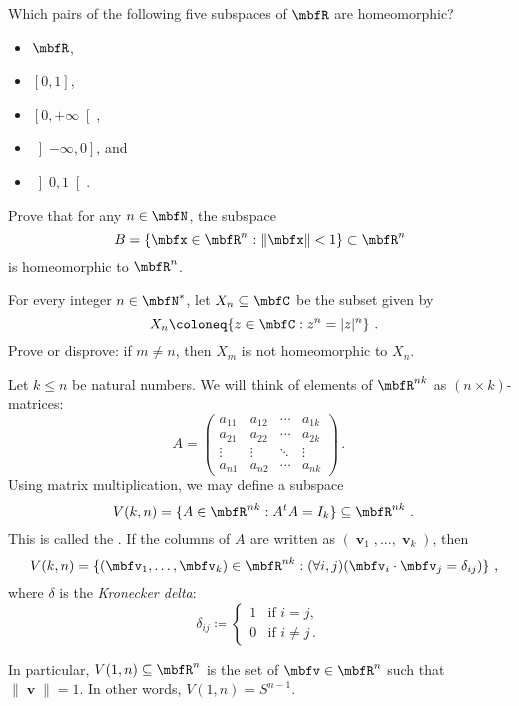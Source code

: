 \documentclass[a4paper,twoside,nols,nobib]{tufte-handout}
\begin{document}

\begin{Problem}
	\noindent
	Which pairs of the following five subspaces of $\RR$ are homeomorphic?
	\begin{itemize}
		\item $\RR$,
		\item $[0,1]$,
		\item $\left[0,+\infty\right[$,
		\item $\left]-\infty, 0\right]$, and
		\item $\left]0,1\right[$.
	\end{itemize}
\end{Problem}


\begin{Problem}
	\noindent
	Prove that for any $n \in \NN$, the subspace
	\[
		B = \{\mbfx \in \RR^n : \|\mbfx\| < 1\} \subset \RR^n
	\]
	is homeomorphic to $\RR^n$.
\end{Problem}


\begin{Problem}
	\noindent
	For every integer $n \in \NN^{\ast}$, let $X_n \subseteq \CC$ be the subset given by
	\[
		X_n \coloneq \{ z \in \CC : z^n = |z|^n \} \period
	\]
	Prove or disprove: if $m \neq n$, then $X_m $ is not homeomorphic to $X_n$.
\end{Problem}


\begin{ntn*}
	Let $ k \leq n $ be natural numbers.
	We will think of elements of $\RR^{nk}$ as $ (n \times k) $-matrices:
	\[
		A = \begin{pmatrix}
			a_{11} & a_{12} & \cdots & a_{1k} \\
			a_{21} & a_{22} & \cdots & a_{2k} \\
			\vdots & \vdots & \ddots & \vdots \\
			a_{n1} & a_{n2} & \cdots & a_{nk}
		\end{pmatrix} \period
	\]
	Using matrix multiplication, we may define a subspace
	\[
		V(k,n) = \{ A \in \RR^{nk} : A^t A = I_k \} \subseteq \RR^{nk} \period
	\]
	This is called the .
	If the columns of $A$ are written as $(\mbfv_1, \dots, \mbfv_k)$, then 
	\[
		V(k,n) = \{ (\mbfv_1, \dots, \mbfv_k) \in \RR^{nk} : (\forall i,j)(\mbfv_i \cdot \mbfv_j = \delta_{ij}) \} \comma
	\]
	where $\delta$ is the \emph{Kronecker delta}:
	\[
		\delta_{ij} \coloneq \begin{cases}
			1 & \text{if } i=j \comma\\
			0 & \text{if } i \neq j \period
		\end{cases}
	\]

	In particular, $V(1,n) \subseteq \RR^n$ is the set of $\mbfv \in \RR^n$ such that $\|\mbfv\| = 1$.
	In other words, $V(1,n) = S^{n-1}$.
\end{ntn*}
\end{document}
